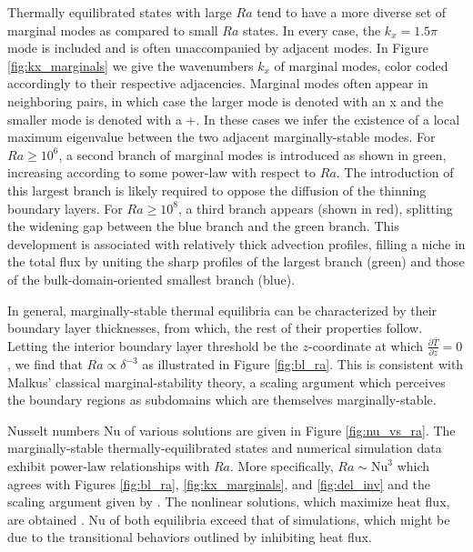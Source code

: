 \documentclass[reprint,amsmath,amssymb,aps]{revtex4-1}
\newcommand\Nu{\mathrm{Nu}}
\begin{document}
Thermally equilibrated states with large $Ra$ tend to have a more diverse set of marginal modes as compared to small $Ra$ states. 
In every case, the $k_x = 1.5\pi$ mode is included and is often unaccompanied by adjacent modes. 
In Figure \ref{fig:kx_marginals} we give the wavenumbers $k_x$ of marginal modes, color coded accordingly to their respective adjacencies. 
Marginal modes often appear in neighboring pairs, in which case the larger mode is denoted with an x and the smaller mode is denoted with a +. 
In these cases we infer the existence of a local maximum eigenvalue between the two adjacent marginally-stable modes. 
For $Ra \geq 10^6$, a second branch of marginal modes is introduced as shown in green, increasing according to some power-law with respect to $Ra$. 
The introduction of this largest branch is likely required to oppose the diffusion of the thinning boundary layers. 
For $Ra \geq 10^8$, a third branch appears (shown in red), splitting the widening gap between the blue branch and the green branch. 
This development is associated with relatively thick advection profiles, filling a niche in the total flux by uniting the sharp profiles of the largest branch (green) and those of the bulk-domain-oriented smallest branch (blue).

In general, marginally-stable thermal equilibria can be characterized by their boundary layer thicknesses, from which, the rest of their properties follow. Letting the interior boundary layer threshold be the $z$-coordinate at which $\frac{\partial \bar{T}}{\partial z} = 0$, we find that $Ra \propto  \delta^{-3}$ as illustrated in Figure \ref{fig:bl_ra}. 
This is consistent with Malkus' classical marginal-stability theory, a scaling argument which perceives the boundary regions as subdomains which are themselves marginally-stable.

Nusselt numbers $\Nu$ of various solutions are given in Figure \ref{fig:nu_vs_ra}. 
The marginally-stable thermally-equilibrated states and numerical simulation data exhibit power-law relationships with $Ra$. 
More specifically, $Ra \sim \Nu^3$ which agrees with Figures \ref{fig:bl_ra}, \ref{fig:kx_marginals}, and \ref{fig:del_inv} and the scaling argument given by \cite{Malkus}. 
The nonlinear solutions, which maximize heat flux, are obtained \cite{Waleffe}. 
$\Nu$ of both equilibria exceed that of simulations, which might be due to the transitional behaviors outlined by \cite{Yalniz} inhibiting heat flux.
\end{document}
